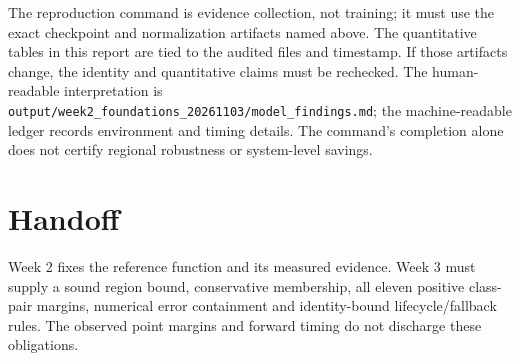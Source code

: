 \documentclass[11pt,a4paper]{article}
\newcommand{\code}[1]{{\small\ttfamily\nolinkurl{#1}}}
\begin{document}
The reproduction command is evidence collection, not training; it must use the exact checkpoint and normalization artifacts named above. The quantitative tables in this report are tied to the audited files and timestamp. If those artifacts change, the identity and quantitative claims must be rechecked. The human-readable interpretation is \code{output/week2_foundations_20261103/model_findings.md}; the machine-readable ledger records environment and timing details. The command's completion alone does not certify regional robustness or system-level savings.

\section{Handoff}
Week 2 fixes the reference function and its measured evidence. Week 3 must supply a sound region bound, conservative membership, all eleven positive class-pair margins, numerical error containment and identity-bound lifecycle/fallback rules. The observed point margins and forward timing do not discharge these obligations.
\end{document}
